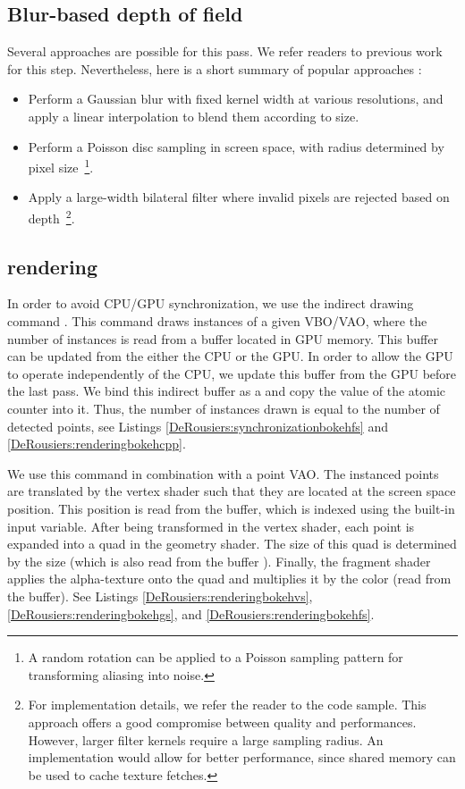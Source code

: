 \subsection{Blur-based depth of field}
Several approaches are possible for this pass. We refer readers to previous work for this step. Nevertheless, here is a short summary of popular approaches :
\begin{itemize}
	\item Perform a Gaussian blur with fixed kernel width at various resolutions, and apply a linear interpolation to blend them according to \coc size.
	\item Perform a Poisson disc sampling in screen space, with radius determined by pixel \coc size~\footnote{A random rotation can be applied to a Poisson sampling pattern for transforming aliasing into noise.}.
	\item Apply a large-width bilateral filter where invalid pixels are rejected based on depth~\footnote{For implementation details, we refer the reader to the code sample. This approach offers a good compromise between quality and performances. However, larger filter kernels require a large sampling radius. An \opencl implementation would allow for better performance, since shared memory can be used to cache texture fetches.}.
\end{itemize}


\subsection{\Bokeh rendering}
In order to avoid CPU/GPU synchronization, we use the indirect drawing command . This command draws instances of a given VBO/VAO, where the number of instances is read from a buffer located in GPU memory. This buffer can be updated from the either the CPU or the GPU. In order to allow the GPU to operate independently of the CPU, we update this buffer from the GPU before the last pass. We bind this indirect buffer as a  and copy the value of the atomic counter into it. Thus, the number of instances drawn is equal to the number of detected \bokeh points, see Listings \ref{DeRousiers:synchronizationbokehfs} and \ref{DeRousiers:renderingbokehcpp}.

We use this command in combination with a point VAO. The instanced points are translated by the vertex shader such that they are located at the screen space \bokeh position. This position is read from the  buffer, which is indexed using the built-in  input variable. After being transformed in the vertex shader, each point is expanded into a quad in the geometry shader. The size of this quad is determined by the \bokeh size (which is also read from the  buffer ). Finally, the fragment shader applies the \bokeh alpha-texture onto the quad and multiplies it by the \bokeh color (read from the  buffer). See Listings \ref{DeRousiers:renderingbokehvs}, \ref{DeRousiers:renderingbokehgs}, and \ref{DeRousiers:renderingbokehfs}.

